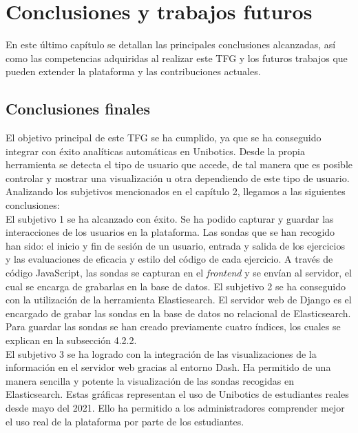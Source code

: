 \chapter{Conclusiones y trabajos futuros}\label{conclusión}

	En este último capítulo se detallan las principales conclusiones alcanzadas, así como las competencias adquiridas al realizar este TFG y los futuros trabajos que pueden extender la plataforma y las contribuciones actuales.
	
	\section{Conclusiones finales} 
	\label{sec:conclusiones_finales} 
El objetivo principal de este TFG se ha cumplido, ya que se ha conseguido integrar con éxito analíticas automáticas en Unibotics. Desde la propia herramienta se detecta el tipo de usuario que accede, de tal manera que es posible controlar y mostrar una visualización u otra dependiendo de este tipo de usuario. Analizando los subjetivos mencionados en el capítulo 2, llegamos a las siguientes conclusiones:\\

 El subjetivo 1 se ha alcanzado con éxito. Se ha podido capturar y guardar las interacciones de los usuarios en la plataforma. Las sondas que se han recogido han sido: el inicio y fin de sesión de un usuario, entrada y salida de los ejercicios y las evaluaciones de eficacia y estilo del código de cada ejercicio. A través de código JavaScript, las sondas se capturan en el \textit{frontend} y se envían al servidor, el cual se encarga de grabarlas en la base de datos.
\newpage
El subjetivo 2 se ha conseguido con la utilización de la herramienta Elasticsearch. El servidor web de Django es el encargado de grabar las sondas en la base de datos no relacional de Elasticsearch. Para guardar las sondas se han creado previamente cuatro índices, los cuales se explican en la subsección 4.2.2.\\

El subjetivo 3 se ha logrado con la integración de las visualizaciones de la información en el servidor web gracias al entorno Dash. Ha permitido de una manera sencilla y potente la visualización de las sondas recogidas en Elasticsearch. Estas gráficas representan el uso de Unibotics de estudiantes reales desde mayo del 2021. Ello ha permitido a los administradores comprender mejor el uso real de la plataforma por parte de los estudiantes.\\


